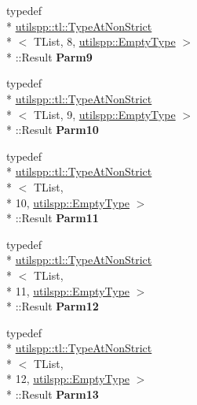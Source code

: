 \begin{DoxyCompactItemize}
\item 
\hypertarget{classutilspp_1_1Functor_a2a7e33db462c352b67f1864a94785894}{typedef \\*
\hyperlink{structutilspp_1_1tl_1_1TypeAtNonStrict}{utilspp\-::tl\-::\-Type\-At\-Non\-Strict}\\*
$<$ T\-List, 8, \hyperlink{structutilspp_1_1EmptyType}{utilspp\-::\-Empty\-Type} $>$\\*
\-::Result {\bfseries Parm9}}\label{classutilspp_1_1Functor_a2a7e33db462c352b67f1864a94785894}

\item 
\hypertarget{classutilspp_1_1Functor_ab92e9ee3213f0e86868da6397ba8c21d}{typedef \\*
\hyperlink{structutilspp_1_1tl_1_1TypeAtNonStrict}{utilspp\-::tl\-::\-Type\-At\-Non\-Strict}\\*
$<$ T\-List, 9, \hyperlink{structutilspp_1_1EmptyType}{utilspp\-::\-Empty\-Type} $>$\\*
\-::Result {\bfseries Parm10}}\label{classutilspp_1_1Functor_ab92e9ee3213f0e86868da6397ba8c21d}

\item 
\hypertarget{classutilspp_1_1Functor_a69606918d71735876989b90f01464574}{typedef \\*
\hyperlink{structutilspp_1_1tl_1_1TypeAtNonStrict}{utilspp\-::tl\-::\-Type\-At\-Non\-Strict}\\*
$<$ T\-List, \\*
10, \hyperlink{structutilspp_1_1EmptyType}{utilspp\-::\-Empty\-Type} $>$\\*
\-::Result {\bfseries Parm11}}\label{classutilspp_1_1Functor_a69606918d71735876989b90f01464574}

\item 
\hypertarget{classutilspp_1_1Functor_a5553f0833ffa3284cd6d8f0987bb8650}{typedef \\*
\hyperlink{structutilspp_1_1tl_1_1TypeAtNonStrict}{utilspp\-::tl\-::\-Type\-At\-Non\-Strict}\\*
$<$ T\-List, \\*
11, \hyperlink{structutilspp_1_1EmptyType}{utilspp\-::\-Empty\-Type} $>$\\*
\-::Result {\bfseries Parm12}}\label{classutilspp_1_1Functor_a5553f0833ffa3284cd6d8f0987bb8650}

\item 
\hypertarget{classutilspp_1_1Functor_a28e37e932741fa110de33527da9cb869}{typedef \\*
\hyperlink{structutilspp_1_1tl_1_1TypeAtNonStrict}{utilspp\-::tl\-::\-Type\-At\-Non\-Strict}\\*
$<$ T\-List, \\*
12, \hyperlink{structutilspp_1_1EmptyType}{utilspp\-::\-Empty\-Type} $>$\\*
\-::Result {\bfseries Parm13}}\label{classutilspp_1_1Functor_a28e37e932741fa110de33527da9cb869}


\end{DoxyCompactItemize}
